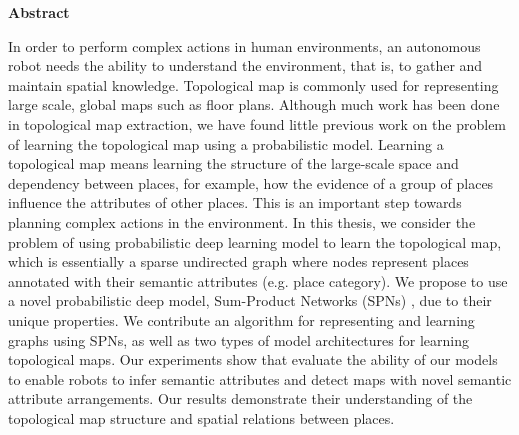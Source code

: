 \documentclass[10pt, titlepage]{article}
\author{Kaiyu Zheng}
\date{April 2017}
\theoremstyle{definition}
\begin{document}


\newpage

\newpage
{} %
\begin{center}\Large \textbf{Abstract}\normalsize\end{center}
In order to perform complex actions in human environments, an autonomous robot needs the ability to understand the environment, that is, to gather and maintain spatial knowledge. Topological map is commonly used for representing large scale, global maps such as floor plans. Although much work has been done in topological map extraction, we have found little previous work on the problem of learning the topological map using a probabilistic model. Learning a topological map means learning the structure of the large-scale space and dependency between places, for example, how the evidence of a group of places influence the attributes of other places. This is an important step towards planning complex actions in the environment. In this thesis, we consider the problem of using probabilistic deep learning model to learn the topological map, which is essentially a sparse undirected graph where nodes represent places annotated with their semantic attributes (e.g. place category). We propose to use a novel probabilistic deep model, Sum-Product Networks (SPNs) \cite{poon2011sum}, due to their unique properties. We contribute an algorithm for representing and learning graphs using SPNs, as well as two types of model architectures for learning topological maps. Our experiments show that evaluate the ability of our models to enable robots to infer semantic attributes and detect maps with novel semantic attribute arrangements. Our results demonstrate their understanding of the topological map structure and spatial relations between places. 


\newpage
\tableofcontents
 
\newpage
{} %
\end{document}
